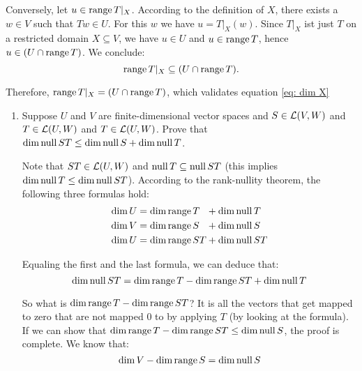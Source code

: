 \begin{xrcs}
\begin{prf}
    Conversely, let $u \in \operatorname{range} T|_X$. According to the definition of $X$, there exists a $w \in V$ such that $Tw \in U$. For this $w$ we have $u = T|_X (w)$. Since $T|_X$ ist just $T$ on a restricted domain $X \subseteq V$, we have $u \in U$ and $u \in \operatorname{range} T$, hence $u \in (U \cap \operatorname{range} T)$. We conclude:
    \begin{equation}
      \operatorname{range} T|_X \subseteq (U \cap \operatorname{range} T).
    \end{equation}

    Therefore, $\operatorname{range} T|_X = (U \cap \operatorname{range} T)$, which validates equation \eqref{eq: dim X}
  \end{prf}
\end{xrcs}

\begin{xrcs}
  \begin{enumerate}
    \item {
    Suppose $U$ and $V$ are finite-dimensional vector spaces and $S \in \mathcal{L} (V,W)$ and $T \in \mathcal{L}(U,W)$ and $T \in \mathcal{L} (U,W)$. Prove that $\dim \operatorname{null} ST \leq \dim \operatorname{null} S + \dim \operatorname{null} T$.
    \begin{prf}
      Note that $ST \in \mathcal{L}(U,W)$ and $\operatorname{null} T \subseteq \operatorname{null} ST$ (this implies $\dim \operatorname{null} T \leq \dim \operatorname{null} ST$). According to the rank-nullity theorem, the following three formulas hold:
      \begin{equation}
        \begin{aligned}
          \dim U &= \dim \operatorname{range} T\phantom{S} + \dim \operatorname{null} T\phantom{S} \\
          \dim V &= \dim \operatorname{range} S\phantom{T} + \dim \operatorname{null} S\phantom{T} \\
          \dim U &= \dim \operatorname{range} ST + \dim \operatorname{null} ST
        \end{aligned}
      \end{equation}

      Equaling the first and the last formula, we can deduce that:
      \begin{equation}
        \label{eq: dim null ST}
        \dim \operatorname{null} ST = \dim \operatorname{range} T - \dim \operatorname{range} ST + \dim \operatorname{null} T
      \end{equation}

      So what is $\dim \operatorname{range} T - \dim \operatorname{range} ST$? It is all the vectors that get mapped to zero that are not mapped $0$ to by applying $T$ (by looking at the formula). If we can show that $\dim \operatorname{range} T - \dim \operatorname{range} ST \leq \dim \operatorname{null} S$, the proof is complete. We know that:
      \begin{equation}
        \dim V - \dim \operatorname{range} S = \dim \operatorname{null} S
      \end{equation}


\end{prf}}
\end{enumerate}
\end{xrcs}
